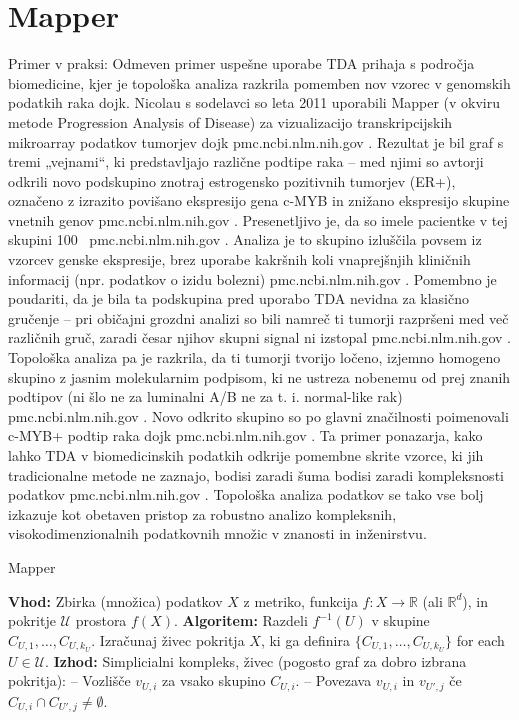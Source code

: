\section{Mapper}
Primer v praksi: Odmeven primer uspešne uporabe TDA prihaja s področja biomedicine, kjer je topološka analiza razkrila pomemben nov vzorec v genomskih podatkih raka dojk. Nicolau s sodelavci so leta 2011 uporabili Mapper (v okviru metode Progression Analysis of Disease) za vizualizacijo transkripcijskih mikroarray podatkov tumorjev dojk
pmc.ncbi.nlm.nih.gov
. Rezultat je bil graf s tremi „vejnami“, ki predstavljajo različne podtipe raka – med njimi so avtorji odkrili novo podskupino znotraj estrogensko pozitivnih tumorjev (ER+), označeno z izrazito povišano ekspresijo gena c-MYB in znižano ekspresijo skupine vnetnih genov
pmc.ncbi.nlm.nih.gov
. Presenetljivo je, da so imele pacientke v tej skupini 100 %
pmc.ncbi.nlm.nih.gov
. Analiza je to skupino izluščila povsem iz vzorcev genske ekspresije, brez uporabe kakršnih koli vnaprejšnjih kliničnih informacij (npr. podatkov o izidu bolezni)
pmc.ncbi.nlm.nih.gov
. Pomembno je poudariti, da je bila ta podskupina pred uporabo TDA nevidna za klasično gručenje – pri običajni grozdni analizi so bili namreč ti tumorji razpršeni med več različnih gruč, zaradi česar njihov skupni signal ni izstopal
pmc.ncbi.nlm.nih.gov
. Topološka analiza pa je razkrila, da ti tumorji tvorijo ločeno, izjemno homogeno skupino z jasnim molekularnim podpisom, ki ne ustreza nobenemu od prej znanih podtipov (ni šlo ne za luminalni A/B ne za t. i. normal-like rak)
pmc.ncbi.nlm.nih.gov
. Novo odkrito skupino so po glavni značilnosti poimenovali c-MYB+ podtip raka dojk
pmc.ncbi.nlm.nih.gov
. Ta primer ponazarja, kako lahko TDA v biomedicinskih podatkih odkrije pomembne skrite vzorce, ki jih tradicionalne metode ne zaznajo, bodisi zaradi šuma bodisi zaradi kompleksnosti podatkov
pmc.ncbi.nlm.nih.gov
. Topološka analiza podatkov se tako vse bolj izkazuje kot obetaven pristop za robustno analizo kompleksnih, visokodimenzionalnih podatkovnih množic v znanosti in inženirstvu.

\begin{algorithm}
\caption{Mapper}\label{alg:mapper2}
\begin{algorithmic}
\State{} \textbf{Vhod:} Zbirka (množica) podatkov $X$ z metriko, funkcija $f: X \rightarrow \mathbb{R}$ (ali $\mathbb{R}^d$), in pokritje $\mathcal{U}$ prostora $f(X)$.
\State{} \textbf{Algoritem:}
    \State{} Razdeli $f^{-1}(U)$  v skupine $C_{U,1}, \ldots, C_{U,k_U}$.
    \State{} Izračunaj živec pokritja $X$, ki ga definira $\{C_{U,1}, \ldots, C_{U,k_U}\}$ for each $U \in \mathcal{U}$.
\EndFor{}
\State{} \textbf{Izhod:} Simplicialni kompleks, živec (pogosto graf za dobro izbrana pokritja):
\State{} \quad – Vozlišče $v_{U,i}$ za vsako skupino $C_{U,i}$.
\State{} \quad – Povezava $v_{U,i}$ in $v_{U',j}$ če $C_{U,i} \cap C_{U',j} \neq \emptyset$.
\end{algorithmic}
\end{algorithm}

